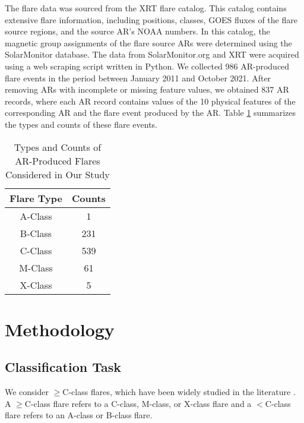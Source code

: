 \documentclass[draft]{agujournal2019}
\begin{document}
The flare data was sourced from the XRT flare catalog. 
This catalog contains extensive flare information, 
including positions, classes, GOES fluxes of the flare source regions, and the source AR's NOAA numbers. 
In this catalog, the magnetic group assignments of the flare source ARs were determined using the SolarMonitor database. The data from SolarMonitor.org and XRT were acquired using a web scraping script written in Python. 
We collected 986 AR-produced flare events in the period
between January 2011 and October 2021. 
After removing ARs with incomplete or missing feature values, 
we obtained 837 AR records, where each AR record
contains values of the 10 physical features of the corresponding AR and
the flare event produced by the AR.
Table \ref{tab:flareevents} summarizes
the types and counts of these flare events.

\begin{table}[h]
    \centering
    \begin{tabular}{|c|c|}
        \hline
        \textbf{Flare Type} & \textbf{Counts} \\ \hline
        A-Class & 1 \\ \hline
        B-Class & 231 \\ \hline
        C-Class & 539\\ \hline
        M-Class & 61\\ \hline
        X-Class & 5\\ \hline   
    \end{tabular}
        \vspace*{+0.5cm}
    \caption{Types and Counts of AR-Produced Flares Considered in Our Study}
    \label{tab:flareevents}
\end{table}

\section{Methodology}
\label{sec:methods}

\subsection{Classification Task}
\label{sec:task}

We consider $\geq$C-class flares,
which have been widely studied in
the literature
\citep{2023NatSR..1313665A,2024FrASS..1098609P,2018ApJ...856....7H,2020ApJ...891...10L,2019ApJ...877..121L,
2018ApJ...858..113N,2022ApJ...941....1S,2021ApJS..257...50T,2023SoPh..298..137V,2023MNRAS.521.5384Z}. 
A $\geq$C-class flare refers to a C-class,
M-class, or X-class flare and
a $<$C-class flare refers to an A-class or B-class flare.
\end{document}

